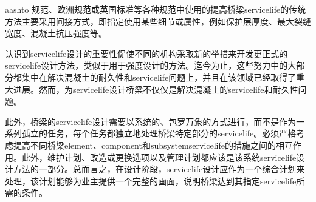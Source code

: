 \acrshort{aashto} 规范、欧洲规范或英国标准等各种规范中使用的提高桥梁\gls*{servicelife}的传统方法主要采用间接方式，即指定使用某些细节或属性，例如保护层厚度、最大裂缝宽度、混凝土抗压强度等。


认识到\gls*{servicelife}设计的重要性促使不同的机构采取新的举措来开发更正式的\gls{servicelife}设计方法，类似于用于强度设计的方法。迄今为止，这些努力中的大部分都集中在解决混凝土的耐久性和\gls*{servicelife}问题上，并且在该领域已经取得了重大进展。然而，为\gls*{servicelife}设计桥梁不仅仅是解决混凝土的\gls*{servicelife}和耐久性问题。

此外，桥梁的\gls*{servicelife}设计需要以系统的、包罗万象的方式进行，而不是作为一系列孤立的任务，每个任务都独立地处理桥梁特定部分的\gls*{servicelife}。必须严格考虑提高不同桥梁\gls*{element}、\gls*{component}和\gls*{subsystem}\gls*{servicelife}的措施之间的相互作用。此外，维护计划、改造或更换选项以及管理计划都应该是该系统\gls*{servicelife}设计方法的一部分。总而言之，在设计阶段，\gls*{servicelife}设计应作为一个综合计划来处理，该计划能够为业主提供一个完整的画面，说明桥梁达到其指定\gls*{servicelife}所需的条件。

